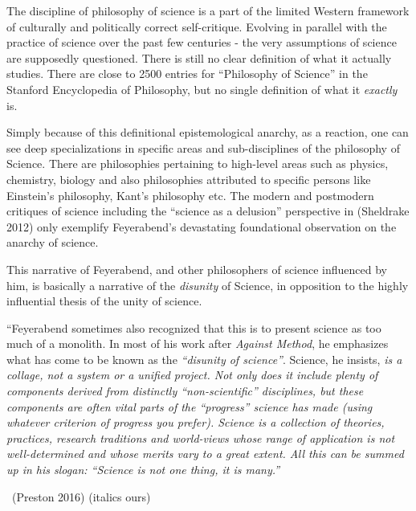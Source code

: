 The discipline of philosophy of science is a part of the limited Western framework of culturally and politically correct self-critique. Evolving in parallel with the practice of science over the past few centuries - the very assumptions of science are supposedly questioned. There is still no clear definition of what it actually studies. There are close to 2500 entries for “Philosophy of Science” in the Stanford Encyclopedia of Philosophy, but no single definition of what it \textit{exactly} is.

Simply because of this definitional epistemological anarchy, as a reaction, one can see deep specializations in specific areas and sub-disci\-plines of the philosophy of Science. There are philosophies pertaining to high-level areas such as physics, chemistry, biology and also philosophies attributed to specific persons like Einstein’s philosophy, Kant’s philosophy etc. The modern and postmodern critiques of science including the “science as a delusion” perspective in (Sheldrake 2012) only exemplify Feyerabend’s devastating foundational observation on the anarchy of science.

\newpage

This narrative of Feyerabend, and other philosophers of science influenced by him, is basically a narrative of the \textit{disunity} of Science, in opposition to the highly influential thesis of the unity of science.

\vskip 2pt

\begin{myquote}
“Feyerabend sometimes also recognized that this is to present science as too much of a monolith. In most of his work after \textit{Against Method}, he emphasizes what has come to be known as the \textit{“disunity of science”}. Science, he insists, \textit{is a collage, not a system or a unified project. Not only does it include plenty of components derived from distinctly “non-scientific” disciplines, but these components are often vital parts of the “progress” science has made (using whatever criterion of progress you prefer). Science is a collection of theories, practices, research traditions and world-views whose range of application is not well-determined and whose merits vary to a great extent. All this can be summed up in his slogan: “Science is not one thing, it is many.”} 

~\hfill (Preston 2016) (italics ours)
\end{myquote}

